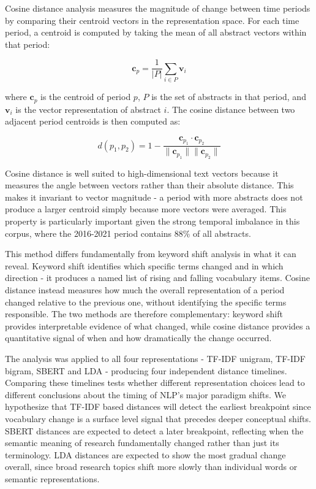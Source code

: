 Cosine distance analysis measures the magnitude of change between time periods by comparing their centroid vectors in the representation space. For each time period, a centroid is computed by taking the mean of all abstract vectors within that period:

\begin{equation}
    \mathbf{c}_p = \frac{1}{|P|} \sum_{i \in P} \mathbf{v}_i
\end{equation}

where $\mathbf{c}_p$ is the centroid of period $p$, $P$ is the set of abstracts in that period, and $\mathbf{v}_i$ is the vector representation of abstract $i$. The cosine distance between two adjacent period centroids is then computed as:

\begin{equation}
    d(p_1, p_2) = 1 - \frac{\mathbf{c}_{p_1} \cdot \mathbf{c}_{p_2}}{\|\mathbf{c}_{p_1}\| \|\mathbf{c}_{p_2}\|}
\end{equation}

Cosine distance is well suited to high-dimensional text vectors because it measures the angle between vectors rather than their absolute distance. This makes it invariant to vector magnitude - a period with more abstracts does not produce a larger centroid simply because more vectors were averaged. This property is particularly important given the strong temporal imbalance in this corpus, where the 2016-2021 period contains 88\% of all abstracts.

This method differs fundamentally from keyword shift analysis in what it can reveal. Keyword shift identifies which specific terms changed and in which direction - it produces a named list of rising and falling vocabulary items. Cosine distance instead measures how much the overall representation of a period changed relative to the previous one, without identifying the specific terms responsible. The two methods are therefore complementary: keyword shift provides interpretable evidence of what changed, while cosine distance provides a quantitative signal of when and how dramatically the change occurred.

The analysis was applied to all four representations - TF-IDF unigram, TF-IDF bigram, SBERT and LDA - producing four independent distance timelines. Comparing these timelines tests whether different representation choices lead to different conclusions about the timing of NLP's major paradigm shifts. We hypothesize that TF-IDF based distances will detect the earliest breakpoint since vocabulary change is a surface level signal that precedes deeper conceptual shifts. SBERT distances are expected to detect a later breakpoint, reflecting when the semantic meaning of research fundamentally changed rather than just its terminology. LDA distances are expected to show the most gradual change overall, since broad research topics shift more slowly than individual words or semantic representations. 

